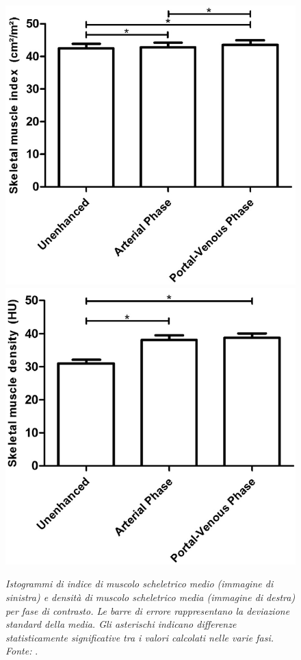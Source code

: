 \begin{figure}[htp]
\centering
\includegraphics[scale=0.55]{Immagini/vanVugt_smi.png}\quad\includegraphics[scale=0.55]{Immagini/vanVugt_smd.png} \vspace{-25pt}
\caption{\label{fig:vanVugt_sm} \textit{Istogrammi di indice di muscolo scheletrico medio (immagine di sinistra) e densità di muscolo scheletrico media (immagine di destra) per fase di contrasto. Le barre di errore rappresentano la deviazione standard della media. Gli asterischi indicano differenze statisticamente significative tra i valori calcolati nelle varie fasi. Fonte:} \cite{vanVugt2018}.}
\end{figure}

